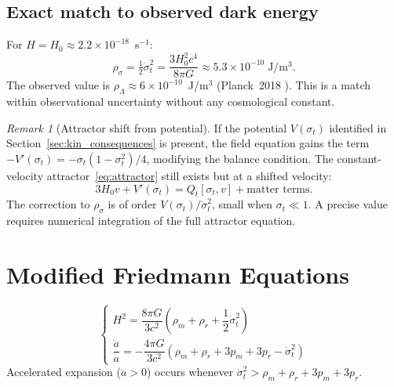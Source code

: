 \documentclass[11pt,a4paper]{article}
\theoremstyle{plain}
\theoremstyle{definition}
\theoremstyle{remark}
\newtheorem{remark}{Remark}[section]
\newcommand{\dotv}{\dot\sigma_t}
\begin{document}
\subsection{Exact match to observed dark energy}

For $H = H_0 \approx 2.2\times10^{-18}$~s$^{-1}$:
\begin{equation}
  \rho_\sigma = \tfrac{1}{2}\dotv^2 = \frac{3H_0^2 c^4}{8\pi G}
  \approx 5.3\times10^{-10}\;\mathrm{J/m^3}.
\end{equation}
The observed value is $\rho_\Lambda \approx 6\times10^{-10}$~J/m$^3$
(Planck~2018 \cite{Planck2018}).  This is a match within observational
uncertainty without any cosmological constant.

\begin{remark}[Attractor shift from potential]
\label{rem:attractor_shift}
If the potential $V(\sigma_t)$ identified in
Section~\ref{sec:kin_consequences} is present, the field equation
gains the term $-V'(\sigma_t) = -\sigma_t(1-\sigma_t^2)/4$, modifying
the balance condition.  The constant-velocity attractor~\eqref{eq:attractor}
still exists but at a shifted velocity:
\begin{equation}
  3H_0 v + V'(\sigma_t) = Q_t[\sigma_t, v] + \text{matter terms}.
\end{equation}
The correction to $\rho_\sigma$ is of order $V(\sigma_t)/\dotv^2$,
small when $\sigma_t \ll 1$.  A precise value requires numerical
integration of the full attractor equation.
\end{remark}

\section{Modified Friedmann Equations}
\label{sec:friedmann}

\begin{equation}
  \boxed{\begin{cases}
    H^2 = \dfrac{8\pi G}{3c^2}\!\left(\rho_m + \rho_r
          + \dfrac{1}{2}\dotv^2\right) \\[10pt]
    \dfrac{\ddot a}{a} = -\dfrac{4\pi G}{3c^2}\!\left(\rho_m + \rho_r
    + 3p_m + 3p_r - \dotv^2\right)
  \end{cases}}
  \label{eq:friedmann}
\end{equation}
Accelerated expansion ($\ddot a > 0$) occurs whenever
$\dotv^2 > \rho_m + \rho_r + 3p_m + 3p_r$.
\end{document}
